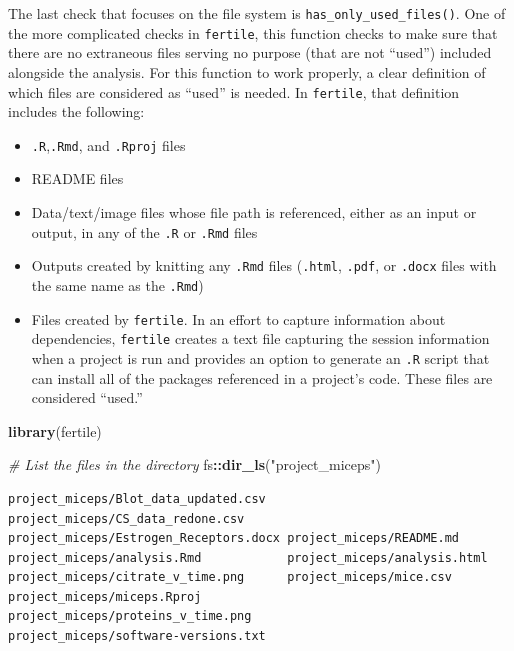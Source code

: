 \documentclass[12pt,twoside]{reedthesis}
\newenvironment{Shaded}{\begin{snugshade}}{\end{snugshade}}
\newcommand{\KeywordTok}[1]{\textcolor[rgb]{0.13,0.29,0.53}{\textbf{#1}}}
\newcommand{\StringTok}[1]{\textcolor[rgb]{0.31,0.60,0.02}{#1}}
\newcommand{\CommentTok}[1]{\textcolor[rgb]{0.56,0.35,0.01}{\textit{#1}}}
\newcommand{\OperatorTok}[1]{\textcolor[rgb]{0.81,0.36,0.00}{\textbf{#1}}}
\newcommand{\NormalTok}[1]{#1}
\providecommand{\tightlist}{%
  \setlength{\itemsep}{0pt}\setlength{\parskip}{0pt}}
\begin{document}
The last check that focuses on the file system is
\texttt{has\_only\_used\_files()}. One of the more complicated checks in
\texttt{fertile}, this function checks to make sure that there are no
extraneous files serving no purpose (that are not ``used'') included
alongside the analysis. For this function to work properly, a clear
definition of which files are considered as ``used'' is needed. In
\texttt{fertile}, that definition includes the following:
\begin{itemize}
\tightlist
\item
  \texttt{.R},\texttt{.Rmd}, and \texttt{.Rproj} files
\item
  README files
\item
  Data/text/image files whose file path is referenced, either as an
  input or output, in any of the \texttt{.R} or \texttt{.Rmd} files
\item
  Outputs created by knitting any \texttt{.Rmd} files (\texttt{.html},
  \texttt{.pdf}, or \texttt{.docx} files with the same name as the
  \texttt{.Rmd})
\item
  Files created by \texttt{fertile}. In an effort to capture information
  about dependencies, \texttt{fertile} creates a text file capturing the
  session information when a project is run and provides an option to
  generate an \texttt{.R} script that can install all of the packages
  referenced in a project's code. These files are considered ``used.''
\end{itemize}
\begin{Shaded}
\begin{Highlighting}[]
\KeywordTok{library}\NormalTok{(fertile)}
\end{Highlighting}
\end{Shaded}
\begin{Shaded}
\begin{Highlighting}[]
\CommentTok{# List the files in the directory}
\NormalTok{fs}\OperatorTok{::}\KeywordTok{dir_ls}\NormalTok{(}\StringTok{"project_miceps"}\NormalTok{)}
\end{Highlighting}
\end{Shaded}
\begin{verbatim}
project_miceps/Blot_data_updated.csv   project_miceps/CS_data_redone.csv      
project_miceps/Estrogen_Receptors.docx project_miceps/README.md               
project_miceps/analysis.Rmd            project_miceps/analysis.html           
project_miceps/citrate_v_time.png      project_miceps/mice.csv                
project_miceps/miceps.Rproj            project_miceps/proteins_v_time.png     
project_miceps/software-versions.txt   
\end{verbatim}
\end{document}
